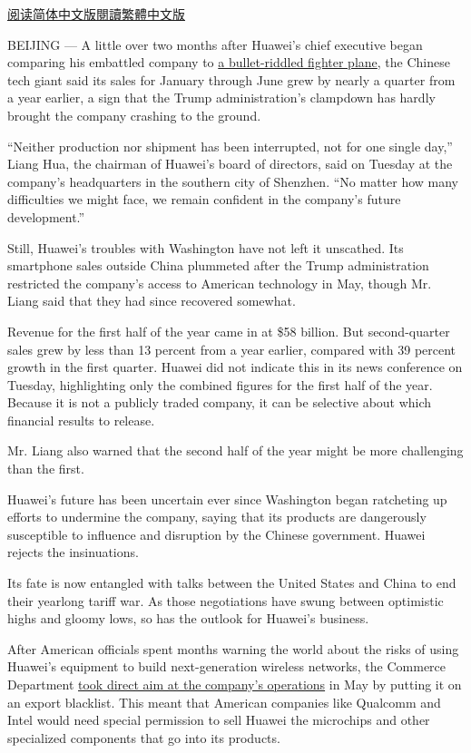 \href{https://cn.nytimes.com/technology/20190731/huawei-sales-trump-blacklist/}{阅读简体中文版}\href{https://cn.nytimes.com/technology/20190731/huawei-sales-trump-blacklist/zh-hant/}{閱讀繁體中文版}

BEIJING --- A little over two months after Huawei's chief executive
began comparing his embattled company to
\href{https://www.nytimes.com/2019/06/17/technology/huawei-trump.html}{a
bullet-riddled fighter plane}, the Chinese tech giant said its sales for
January through June grew by nearly a quarter from a year earlier, a
sign that the Trump administration's clampdown has hardly brought the
company crashing to the ground.

``Neither production nor shipment has been interrupted, not for one
single day,'' Liang Hua, the chairman of Huawei's board of directors,
said on Tuesday at the company's headquarters in the southern city of
Shenzhen. ``No matter how many difficulties we might face, we remain
confident in the company's future development.''

Still, Huawei's troubles with Washington have not left it unscathed. Its
smartphone sales outside China plummeted after the Trump administration
restricted the company's access to American technology in May, though
Mr. Liang said that they had since recovered somewhat.

Revenue for the first half of the year came in at \$58 billion. But
second-quarter sales grew by less than 13 percent from a year earlier,
compared with 39 percent growth in the first quarter. Huawei did not
indicate this in its news conference on Tuesday, highlighting only the
combined figures for the first half of the year. Because it is not a
publicly traded company, it can be selective about which financial
results to release.

Mr. Liang also warned that the second half of the year might be more
challenging than the first.

Huawei's future has been uncertain ever since Washington began
ratcheting up efforts to undermine the company, saying that its products
are dangerously susceptible to influence and disruption by the Chinese
government. Huawei rejects the insinuations.

Its fate is now entangled with talks between the United States and China
to end their yearlong tariff war. As those negotiations have swung
between optimistic highs and gloomy lows, so has the outlook for
Huawei's business.

After American officials spent months warning the world about the risks
of using Huawei's equipment to build next-generation wireless networks,
the Commerce Department
\href{https://www.nytimes.com/2019/05/16/technology/huawei-ban-president-trump.html}{took
direct aim at the company's operations} in May by putting it on an
export blacklist. This meant that American companies like Qualcomm and
Intel would need special permission to sell Huawei the microchips and
other specialized components that go into its products.

